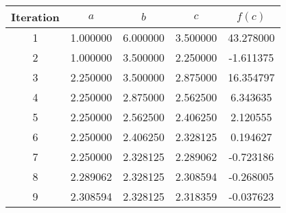\begin{tabular}{|c|c|c|c|c|}
\hline
Iteration & $a$ & $b$ & $c$ & $f(c)$ \\
\hline
1 & 1.000000 & 6.000000 & 3.500000 & 43.278000 \\
\hline
2 & 1.000000 & 3.500000 & 2.250000 & -1.611375 \\
\hline
3 & 2.250000 & 3.500000 & 2.875000 & 16.354797 \\
\hline
4 & 2.250000 & 2.875000 & 2.562500 & 6.343635 \\
\hline
5 & 2.250000 & 2.562500 & 2.406250 & 2.120555 \\
\hline
6 & 2.250000 & 2.406250 & 2.328125 & 0.194627 \\
\hline
7 & 2.250000 & 2.328125 & 2.289062 & -0.723186 \\
\hline
8 & 2.289062 & 2.328125 & 2.308594 & -0.268005 \\
\hline
9 & 2.308594 & 2.328125 & 2.318359 & -0.037623 \\
\hline
\end{tabular}